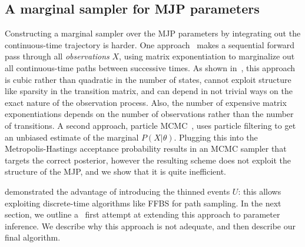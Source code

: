 \subsection{A marginal sampler for MJP parameters} 
Constructing a marginal sampler over the MJP parameters by
integrating out the continuous-time trajectory is harder.
One approach~\cite{FearnSher2006} makes a sequential 
forward pass through all {\em observations} $X$, using matrix exponentiation
to marginalize out all
continuous-time paths between successive times. As
shown in~\cite{RaoTeh13}, this approach is cubic rather than 
quadratic in the 
number of states, cannot exploit structure like sparsity in the 
transition matrix, and can depend in not trivial ways on the exact 
nature of the observation process.
Also, the number of expensive matrix exponentiations depends on
the number of observations rather than the number of transitions.
%
%
A second approach, particle MCMC~\cite{Andrieu10}, uses 
particle filtering to get an unbiased estimate of the marginal 
$P(X|\theta)$. Plugging this into the Metropolis-Hastings 
acceptance probability results in an MCMC sampler that targets the 
correct posterior, however %
the resulting scheme does not exploit the structure 
of the MJP, and we show that it is quite inefficient.

\cite{RaoTeh13, RaoTeh12} demonstrated the advantage of
introducing the thinned events $U$: this allows exploiting discrete-time 
algorithms like FFBS for path sampling.
In the next section, we outline a \naive\  first attempt at extending this 
approach to 
parameter inference.
We describe why this approach is not adequate, and then describe our
final algorithm. %
